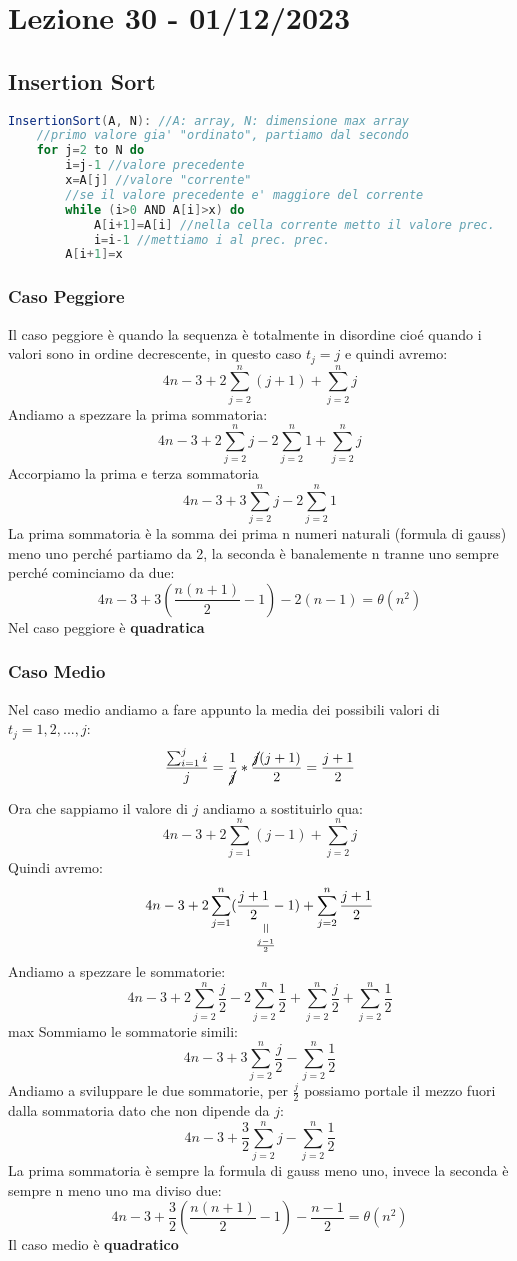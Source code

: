 \section{Lezione 30 - 01/12/2023}
\subsection{Insertion Sort}

\begin{lstlisting}[language=Java]
InsertionSort(A, N): //A: array, N: dimensione max array 
    //primo valore gia' "ordinato", partiamo dal secondo
    for j=2 to N do
        i=j-1 //valore precedente
        x=A[j] //valore "corrente"
        //se il valore precedente e' maggiore del corrente
        while (i>0 AND A[i]>x) do 
            A[i+1]=A[i] //nella cella corrente metto il valore prec.
            i=i-1 //mettiamo i al prec. prec.
        A[i+1]=x
\end{lstlisting}


\subsubsection{Caso Peggiore}
Il caso peggiore è quando la sequenza è totalmente in disordine cioé quando i valori sono in ordine decrescente, in questo caso $t_j=j$ e quindi avremo:
$$ 4n-3+2\sum_{j=2}^n (j+1) + \sum_{j=2}^n j $$
Andiamo a spezzare la prima sommatoria:
$$ 4n-3+2\sum_{j=2}^n j - 2\sum_{j=2}^n 1 + \sum_{j=2}^n j $$
Accorpiamo la prima e terza sommatoria
$$ 4n-3+3\sum_{j=2}^n j - 2\sum_{j=2}^n 1 $$
La prima sommatoria è la somma dei prima n numeri naturali (formula di gauss) meno uno perché partiamo da 2, la seconda è banalemente n tranne uno sempre perché cominciamo da due:
$$ 4n -3 +3(\frac{n(n+1)}{2}-1) - 2(n-1) = \theta(n^2) $$
Nel caso peggiore è \textbf{quadratica}

\subsubsection{Caso Medio}
Nel caso medio andiamo a fare appunto la media dei possibili valori di $t_j=1,2,...,j$:
$$ \frac{\sum_{i=1}^j i}{j} = \frac{1}{\cancel{j}}*\frac{\cancel{j}(j+1)}{2} = \frac{j+1}{2} $$

Ora che sappiamo il valore di $j$ andiamo a sostituirlo qua:
$$ 4n-3+2\sum_{j=1}^n (j-1) + \sum_{j=2}^n j $$
Quindi avremo:
$$ 4n-3+2\sum_{j=1}^n (\equalto{\frac{j+1}{2}-1}{\frac{j-1}{2}}) + \sum_{j=2}^n \frac{j+1}{2} $$
Andiamo a spezzare le sommatorie:
$$ 4n-3+2\sum_{j=2}^{n} \frac{j}{2} - 2 \sum_{j=2}^n \frac{1}{2} + \sum_{j=2}^{n} \frac{j}{2} + \sum_{j=2}^{n} \frac{1}{2}$$max
Sommiamo le sommatorie simili:
$$ 4n-3+3\sum_{j=2}^{n} \frac{j}{2} - \sum_{j=2}^n \frac{1}{2} $$
Andiamo a sviluppare le due sommatorie, per $\frac{j}{2}$ possiamo portale il mezzo fuori dalla sommatoria dato che non dipende da $j$:
$$ 4n-3+\frac{3}{2}\sum_{j=2}^{n} j - \sum_{j=2}^n \frac{1}{2} $$
La prima sommatoria è sempre la formula di gauss meno uno, invece la seconda è sempre n meno uno ma diviso due:
$$ 4n-3+\frac{3}{2}(\frac{n(n+1)}{2} -1) - \frac{n-1}{2} = \theta(n^2)$$
Il caso medio è \textbf{quadratico}

